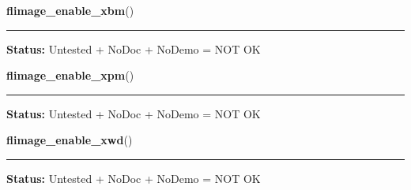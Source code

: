     \label{xformslib:library:flimage_enable_xbm}

    \vspace{0.5ex}

\hspace{.8\funcindent}\begin{boxedminipage}{\funcwidth}

    \raggedright \textbf{flimage\_enable\_xbm}()

    \vspace{-1.5ex}

    \rule{\textwidth}{0.5\fboxrule}
\setlength{\parskip}{2ex}
\setlength{\parskip}{1ex}
\textbf{Status:} Untested + NoDoc + NoDemo = NOT OK



    \end{boxedminipage}

    \label{xformslib:library:flimage_enable_xpm}

    \vspace{0.5ex}

\hspace{.8\funcindent}\begin{boxedminipage}{\funcwidth}

    \raggedright \textbf{flimage\_enable\_xpm}()

    \vspace{-1.5ex}

    \rule{\textwidth}{0.5\fboxrule}
\setlength{\parskip}{2ex}
\setlength{\parskip}{1ex}
\textbf{Status:} Untested + NoDoc + NoDemo = NOT OK



    \end{boxedminipage}

    \label{xformslib:library:flimage_enable_xwd}

    \vspace{0.5ex}

\hspace{.8\funcindent}\begin{boxedminipage}{\funcwidth}

    \raggedright \textbf{flimage\_enable\_xwd}()

    \vspace{-1.5ex}

    \rule{\textwidth}{0.5\fboxrule}
\setlength{\parskip}{2ex}
\setlength{\parskip}{1ex}
\textbf{Status:} Untested + NoDoc + NoDemo = NOT OK



    \end{boxedminipage}

